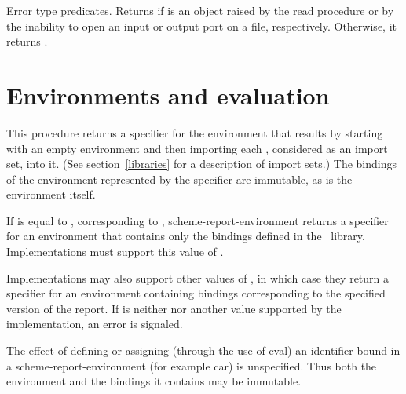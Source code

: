 \begin{entry}{
}

Error type predicates.  Returns \schtrue{} if  is an
object raised by the {\cf read} procedure or by the inability to open
an input or output port on a file, respectively.  Otherwise, it
returns \schfalse.

\end{entry}

\section{Environments and evaluation}

\begin{entry}{
}
\label{environments}

This procedure returns a specifier for the environment that results by
starting with an empty environment and then importing each ,
considered as an import set, into it.  (See section~\ref{libraries} for
a description of import sets.)  The bindings of the environment
represented by the specifier are immutable, as is the environment itself.

\end{entry}

\begin{entry}{
}

If  is equal to {},
corresponding to \rfivers,
{\cf scheme-report-environment} returns a specifier for an
environment that contains only the bindings
defined in the \rfivers\ library.
Implementations must support this value of .

Implementations may also support other values of , in which
case they return a specifier for an environment containing bindings corresponding to the specified version of the report.
If 
is neither {} nor another value supported by
the implementation, an error is signaled.

The effect of defining or assigning (through the use of {\cf eval})
an identifier bound in a {\cf scheme-report-environment} (for example
{\cf car}) is unspecified.  Thus both the environment and the bindings
it contains may be immutable.

\end{entry}

